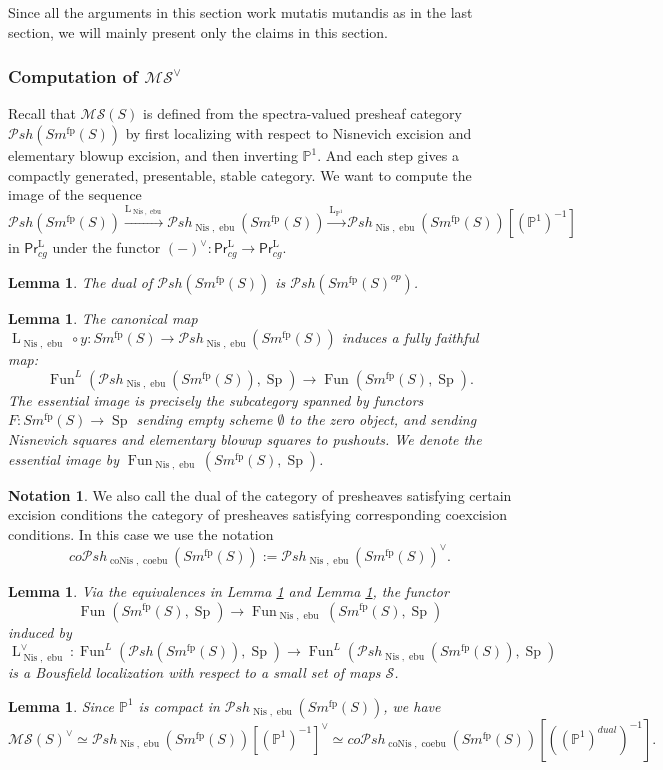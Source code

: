 \documentclass{article}
\newtheorem{lm}[thm]{Lemma}
\theoremstyle{definition}
\newtheorem{nota}[thm]{Notation}
\newcommand{\on}{\operatorname}
\newcommand{\PrL}{\mathsf{Pr}^\mathrm{L} }
\begin{document}
Since all the arguments in this section work mutatis mutandis as in the last section, we will mainly present only the claims in this section.
\subsubsection{Computation of $\mathcal{MS}^\vee$}
Recall that $\mathcal{MS}(S)$ is defined from the spectra-valued presheaf category $\mathcal{P}sh(Sm^{\on{fp}}(S))$ by first localizing with respect to Nisnevich excision and elementary blowup excision, and then inverting $\mathbb{P}^1$. And each step gives a compactly generated, presentable, stable category. We want to compute the image of the sequence\[
\mathcal{P}sh(Sm^{\on{fp}}(S))\xrightarrow{\on{L}_{\on{Nis},\on{ebu}}}\mathcal{P}sh_{\on{Nis},\on{ebu}}(Sm^{\on{fp}}(S))\xrightarrow{\on{L}_{\mathbb{P}^1}}\mathcal{P}sh_{\on{Nis},\on{ebu}}(Sm^{\on{fp}}(S))[(\mathbb{P}^1)^{-1}]
\]
in $\PrL_{cg}$ under the functor $(-)^{\vee}:\PrL_{cg}\rightarrow\PrL_{cg}$.
\begin{lm}\label{id1`}
The dual of $\mathcal{P}sh(Sm^{\on{fp}}(S))$ is $\mathcal{P}sh(Sm^{\on{fp}}(S)^{op})$.
\end{lm}
\begin{lm}\label{id2`}
The canonical map $\on{L}_{\on{Nis},\on{ebu}}\circ y: Sm^{\on{fp}}(S)\rightarrow\mathcal{P}sh_{\on{Nis},\on{ebu}}(Sm^{\on{fp}}(S))$ induces a fully faithful map:\[
\on{Fun}^L(\mathcal{P}sh_{\on{Nis},\on{ebu}}(Sm^{\on{fp}}(S)),\on{Sp})\rightarrow\on{Fun}(Sm^{\on{fp}}(S),\on{Sp}).\]
The essential image is precisely the subcategory spanned by functors $F: Sm^{\on{fp}}(S)\rightarrow\on{Sp}$ sending empty scheme $\emptyset$ to the zero object, and sending Nisnevich squares and elementary blowup squares to pushouts. We denote the essential image by $\on{Fun}_{\on{Nis},\on{ebu}}(Sm^{\on{fp}}(S),\on{Sp})$.
\end{lm}
\begin{nota}
We also call the dual of the category of presheaves satisfying certain excision conditions the category of presheaves satisfying corresponding coexcision conditions. In this case we use the notation\[
co\mathcal{P}sh_{\on{coNis},\on{coebu}}(Sm^{\on{fp}}(S)):=\mathcal{P}sh_{\on{Nis},\on{ebu}}(Sm^{\on{fp}}(S))^\vee.\]
\end{nota}
\begin{lm}\label{desc`}
Via the equivalences in Lemma \ref{id1`} and Lemma \ref{id2`}, the functor\[
\on{Fun}(Sm^{\on{fp}}(S),\on{Sp})\rightarrow\on{Fun}_{\on{Nis},\on{ebu}}(Sm^{\on{fp}}(S),\on{Sp})\]
induced by\[
\on{L}_{\on{Nis},\on{ebu}}^\vee:\on{Fun}^L(\mathcal{P}sh(Sm^{\on{fp}}(S)),\on{Sp})\rightarrow\on{Fun}^L(\mathcal{P}sh_{\on{Nis},\on{ebu}}(Sm^{\on{fp}}(S)),\on{Sp})\]
is a Bousfield localization with respect to a small set of maps $\mathcal{S}$.
\end{lm}
\begin{lm}
Since $\mathbb{P}^1$ is compact in $\mathcal{P}sh_{\on{Nis},\on{ebu}}(Sm^{\on{fp}}(S))$, we have\[
\mathcal{MS}(S)^{\vee}\simeq\mathcal{P}sh_{\on{Nis},\on{ebu}}(Sm^{\on{fp}}(S))[(\mathbb{P}^1)^{-1}]^{\vee}\simeq co\mathcal{P}sh_{\on{coNis},\on{coebu}}(Sm^{\on{fp}}(S))[((\mathbb{P}^1)^{dual})^{-1}].\]
\end{lm}
\end{document}
